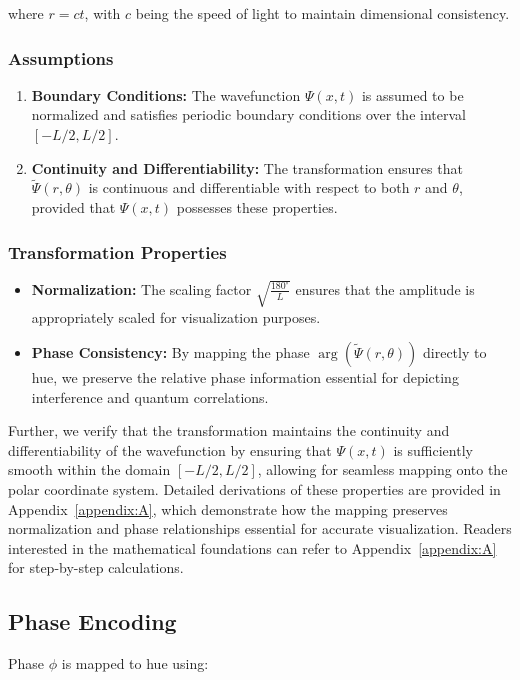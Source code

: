 \documentclass[12pt]{article}
\begin{document}
where \(r = ct\), with \(c\) being the speed of light to maintain dimensional consistency.

\subsubsection{Assumptions}
\begin{enumerate}
    \item \textbf{Boundary Conditions:} The wavefunction \(\Psi(x,t)\) is assumed to be normalized and satisfies periodic boundary conditions over the interval \([-L/2, L/2]\).
    \item \textbf{Continuity and Differentiability:} The transformation ensures that \(\tilde{\Psi}(r, \theta)\) is continuous and differentiable with respect to both \(r\) and \(\theta\), provided that \(\Psi(x,t)\) possesses these properties.
\end{enumerate}

\subsubsection{Transformation Properties}
\begin{itemize}
    \item \textbf{Normalization:} The scaling factor \(\sqrt{\frac{180^\circ}{L}}\) ensures that the amplitude is appropriately scaled for visualization purposes.
    \item \textbf{Phase Consistency:} By mapping the phase \(\arg(\tilde{\Psi}(r, \theta))\) directly to hue, we preserve the relative phase information essential for depicting interference and quantum correlations.
\end{itemize}

Further, we verify that the transformation maintains the continuity and differentiability of the wavefunction by ensuring that \(\Psi(x,t)\) is sufficiently smooth within the domain \([-L/2, L/2]\), allowing for seamless mapping onto the polar coordinate system. Detailed derivations of these properties are provided in Appendix~\ref{appendix:A}, which demonstrate how the mapping preserves normalization and phase relationships essential for accurate visualization. Readers interested in the mathematical foundations can refer to Appendix~\ref{appendix:A} for step-by-step calculations.

\subsection{Phase Encoding}
Phase \(\phi\) is mapped to hue using:
\end{document}
